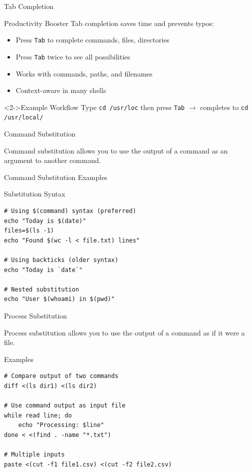 \documentclass[presentation,aspectratio=1610]{beamer}
\begin{document}
\begin{frame}[label={sec:orga631935},fragile]{Tab Completion}
 \begin{exampleblock}{Productivity Booster}\label{sec:org9e934a8}
\alert{Tab completion} saves time and prevents typos:

\begin{itemize}[<+->]
\item Press \texttt{Tab} to complete commands, files, directories
\item Press \texttt{Tab} twice to see all possibilities
\item Works with commands, paths, and filenames
\item Context-aware in many shells
\end{itemize}
\end{exampleblock}
\begin{block}<2->{Example Workflow}
Type \texttt{cd /usr/loc} then press \texttt{Tab} \(\rightarrow\) completes to \texttt{cd /usr/local/}
\end{block}
\end{frame}
\begin{frame}[label={sec:org3217197}]{Command Substitution}
\begin{definition}\label{sec:org2375a2d}
Command substitution allows you to use the output of a command as an argument to another command.
\end{definition}
\end{frame}
\begin{frame}[label={sec:orgea8b193},fragile]{Command Substitution Examples}
 \begin{block}{Substitution Syntax}
\begin{verbatim}
# Using $(command) syntax (preferred)
echo "Today is $(date)"
files=$(ls -1)
echo "Found $(wc -l < file.txt) lines"

# Using backticks (older syntax)
echo "Today is `date`"

# Nested substitution
echo "User $(whoami) in $(pwd)"
\end{verbatim}
\end{block}
\end{frame}
\begin{frame}[label={sec:org083d459},fragile]{Process Substitution}
 \begin{definition}\label{sec:org62497c1}
Process substitution allows you to use the output of a command as if it were a file.
\end{definition}
\begin{block}{Examples}
\begin{verbatim}
# Compare output of two commands
diff <(ls dir1) <(ls dir2)

# Use command output as input file
while read line; do
    echo "Processing: $line"
done < <(find . -name "*.txt")

# Multiple inputs
paste <(cut -f1 file1.csv) <(cut -f2 file2.csv)
\end{verbatim}
\end{block}
\end{frame}
\end{document}
